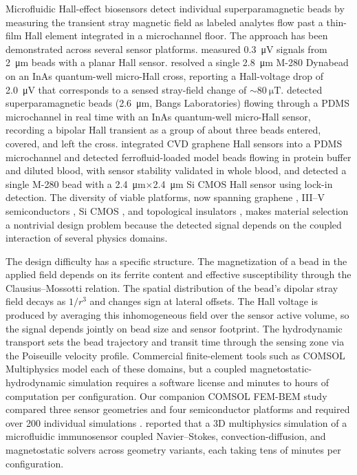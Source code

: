 \documentclass[pdflatex,sn-basic]{sn-jnl}
\theoremstyle{thmstyleone}
\theoremstyle{thmstyletwo}
\theoremstyle{thmstylethree}
\begin{document}
Microfluidic Hall-effect biosensors detect individual superparamagnetic beads by measuring the transient stray magnetic field as labeled analytes flow past a thin-film Hall element integrated in a microchannel floor. The approach has been demonstrated across several sensor platforms. \citet{ejsing2004} measured \SI{0.3}{\micro\volt} signals from \SI{2}{\micro\meter} beads with a planar Hall sensor. \citet{mihajlovic2005} resolved a single \SI{2.8}{\micro\meter} M-280 Dynabead on an InAs quantum-well micro-Hall cross, reporting a Hall-voltage drop of \SI{2.0}{\micro\volt} that corresponds to a sensed stray-field change of ${\sim}\SI{80}{\micro\tesla}$. \citet{aledealat2009} detected superparamagnetic beads (\SI{2.6}{\micro\meter}, Bangs Laboratories) flowing through a PDMS microchannel in real time with an InAs quantum-well micro-Hall sensor, recording a bipolar Hall transient as a group of about three beads entered, covered, and left the cross. \citet{shah2023} integrated CVD graphene Hall sensors into a PDMS microchannel and detected ferrofluid-loaded model beads flowing in protein buffer and diluted blood, with sensor stability validated in whole blood, and \citet{besse2002} detected a single M-280 bead with a \SI{2.4}{\micro\meter}$\times$\SI{2.4}{\micro\meter} Si CMOS Hall sensor using lock-in detection. The diversity of viable platforms, now spanning graphene \citep{dauber2015,kaidarova2021}, III--V semiconductors \citep{mihajlovic2005,gilbertson2011}, Si CMOS \citep{besse2002}, and topological insulators \citep{saeed2024}, makes material selection a nontrivial design problem because the detected signal depends on the coupled interaction of several physics domains.

The design difficulty has a specific structure. The magnetization of a bead in the applied field depends on its ferrite content and effective susceptibility through the Clausius--Mossotti relation. The spatial distribution of the bead's dipolar stray field decays as $1/r^3$ and changes sign at lateral offsets. The Hall voltage is produced by averaging this inhomogeneous field over the sensor active volume, so the signal depends jointly on bead size and sensor footprint. The hydrodynamic transport sets the bead trajectory and transit time through the sensing zone via the Poiseuille velocity profile. Commercial finite-element tools such as COMSOL Multiphysics model each of these domains, but a coupled magnetostatic-hydrodynamic simulation requires a software license and minutes to hours of computation per configuration. Our companion COMSOL FEM-BEM study compared three sensor geometries and four semiconductor platforms and required over 200 individual simulations \citep{govindaraju2025}. \citet{jebari2024} reported that a 3D multiphysics simulation of a microfluidic immunosensor coupled Navier--Stokes, convection-diffusion, and magnetostatic solvers across geometry variants, each taking tens of minutes per configuration.
\end{document}
